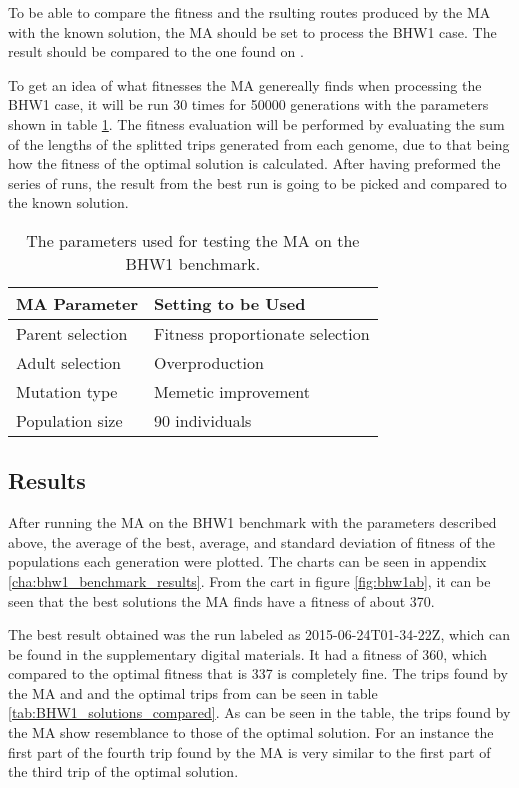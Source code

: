 To be able to compare the fitness and the rsulting routes produced by the MA with the known solution, the MA should be set to process the BHW1 case. The result should be compared to the one found on \citet{BHW1Solution}.

To get an idea of what fitnesses the MA genereally finds when processing the BHW1 case, it will be run 30 times for 50000 generations with the parameters shown in table \ref{tab:BHW1_params_table}. The fitness evaluation will be performed by evaluating the sum of the lengths of the splitted trips generated from each genome, due to that being how the fitness of the optimal solution is calculated. After having preformed the series of runs, the result from the best run is going to be picked and compared to the known solution.

{
\begin{table}[tbph]
\centering
\begin{tabular}{ll}
\toprule
\textbf{MA Parameter} & \textbf{Setting to be Used}     \\ \midrule
Parent selection      & Fitness proportionate selection \\
Adult selection       & Overproduction                  \\
Mutation type         & Memetic improvement             \\
Population size       & 90 individuals                  \\ \bottomrule
\end{tabular}
\caption{The parameters used for testing the MA on the BHW1 benchmark.}
\label{tab:BHW1_params_table}
\end{table}
}

\subsection{Results}

After running the MA on the BHW1 benchmark with the parameters described above, the average of the best, average, and standard deviation of fitness of the populations each generation were plotted. The charts can be seen in appendix \ref{cha:bhw1_benchmark_results}. From the cart in figure \ref{fig:bhw1ab}, it can be seen that the best solutions the MA finds have a fitness of about 370.

The best result obtained was the run labeled as 2015-06-24T01-34-22Z, which can be found in the supplementary digital materials. It had a fitness of 360, which compared to the optimal fitness that is 337 is completely fine. The trips found by the MA and and the optimal trips from \citet{BHW1Solution} can be seen in table \ref{tab:BHW1_solutions_compared}. As can be seen in the table, the trips found by the MA show resemblance to those of the optimal solution. For an instance the first part of the fourth trip found by the MA is very similar to the first part of the third trip of the optimal solution.

